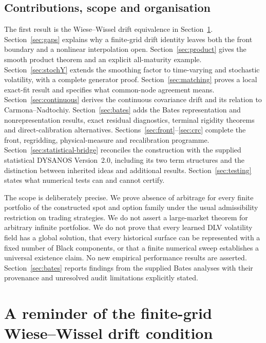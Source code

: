 \documentclass[11pt,a4paper]{article}
\numberwithin{equation}{section}
\theoremstyle{definition}\newtheorem{definition}[theorem]{Definition}
\theoremstyle{remark}\newtheorem{remark}[theorem]{Remark}
\begin{document}
\subsection{Contributions, scope and organisation}
The first result is the Wiese--Wissel drift equivalence in Section~\ref{sec:finite}. Section~\ref{sec:gaps} explains why a finite-grid drift identity leaves both the front boundary and a nonlinear interpolation open. Section~\ref{sec:product} gives the smooth product theorem and an explicit all-maturity example. Section~\ref{sec:stochY} extends the smoothing factor to time-varying and stochastic volatility, with a complete generator proof. Section~\ref{sec:matching} proves a local exact-fit result and specifies what common-node agreement means. Section~\ref{sec:continuous} derives the continuous covariance drift and its relation to Carmona--Nadtochiy. Section~\ref{sec:bates} adds the Bates representation and nonrepresentation results, exact residual diagnostics, terminal rigidity theorems and direct-calibration alternatives. Sections~\ref{sec:front}--\ref{sec:crc} complete the front, regridding, physical-measure and recalibration programme. Section~\ref{sec:statistical-bridge} reconciles the construction with the supplied statistical DYSANOS Version~2.0, including its two term structures and the distinction between inherited ideas and additional results. Section~\ref{sec:testing} states what numerical tests can and cannot certify.

The scope is deliberately precise. We prove absence of arbitrage for every finite portfolio of the constructed spot and option family under the usual admissibility restriction on trading strategies. We do not assert a large-market theorem for arbitrary infinite portfolios. We do not prove that every learned DLV volatility field has a global solution, that every historical surface can be represented with a fixed number of Black components, or that a finite numerical sweep establishes a universal existence claim. No new empirical performance results are asserted. Section~\ref{sec:bates} reports findings from the supplied Bates analyses with their provenance and unresolved audit limitations explicitly stated.

\section{A reminder of the finite-grid Wiese--Wissel drift condition}
\label{sec:finite}
\end{document}
